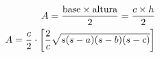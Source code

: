 \documentclass[preview]{standalone}
\begin{document}
\begin{align*}
\special{dvisvgm:raw <g id='unique000'>}A = \frac{\text{base} \times \text{altura}}{2} = \frac{c \times h}{2}\\ \special{dvisvgm:raw </g>}\special{dvisvgm:raw <g id='unique001'>}A = \frac{c}{2} \cdot \left[ \frac{2}{c} \sqrt{s(s-a)(s-b)(s-c)} \right]\special{dvisvgm:raw </g>}
\end{align*}
\end{document}
